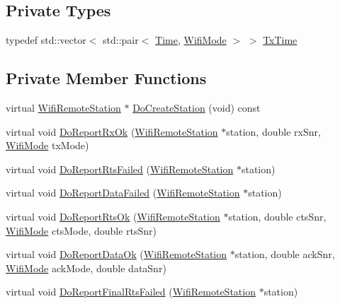 \subsection*{Private Types}
\begin{DoxyCompactItemize}
\item 
typedef std\+::vector$<$ std\+::pair$<$ \hyperlink{classns3_1_1Time}{Time}, \hyperlink{classns3_1_1WifiMode}{Wifi\+Mode} $>$ $>$ \hyperlink{classns3_1_1RrpaaWifiManager_a4319a75b6c1316e6b389e7108da56918}{Tx\+Time}
\end{DoxyCompactItemize}
\subsection*{Private Member Functions}
\begin{DoxyCompactItemize}
\item 
virtual \hyperlink{structns3_1_1WifiRemoteStation}{Wifi\+Remote\+Station} $\ast$ \hyperlink{classns3_1_1RrpaaWifiManager_ae43ecb855293337eb117fddafa983fd1}{Do\+Create\+Station} (void) const 
\item 
virtual void \hyperlink{classns3_1_1RrpaaWifiManager_a82aef96fbc77296653f7b9031639e24b}{Do\+Report\+Rx\+Ok} (\hyperlink{structns3_1_1WifiRemoteStation}{Wifi\+Remote\+Station} $\ast$station, double rx\+Snr, \hyperlink{classns3_1_1WifiMode}{Wifi\+Mode} tx\+Mode)
\item 
virtual void \hyperlink{classns3_1_1RrpaaWifiManager_ad721ce23003aee7f05d8b1f5b66b2c64}{Do\+Report\+Rts\+Failed} (\hyperlink{structns3_1_1WifiRemoteStation}{Wifi\+Remote\+Station} $\ast$station)
\item 
virtual void \hyperlink{classns3_1_1RrpaaWifiManager_a1eaf934bbd61fba16475071bd67a6064}{Do\+Report\+Data\+Failed} (\hyperlink{structns3_1_1WifiRemoteStation}{Wifi\+Remote\+Station} $\ast$station)
\item 
virtual void \hyperlink{classns3_1_1RrpaaWifiManager_aeef92718ae43a5daf8f7517d670ec201}{Do\+Report\+Rts\+Ok} (\hyperlink{structns3_1_1WifiRemoteStation}{Wifi\+Remote\+Station} $\ast$station, double cts\+Snr, \hyperlink{classns3_1_1WifiMode}{Wifi\+Mode} cts\+Mode, double rts\+Snr)
\item 
virtual void \hyperlink{classns3_1_1RrpaaWifiManager_aac417bc472f545a7f4a03ae8d788773f}{Do\+Report\+Data\+Ok} (\hyperlink{structns3_1_1WifiRemoteStation}{Wifi\+Remote\+Station} $\ast$station, double ack\+Snr, \hyperlink{classns3_1_1WifiMode}{Wifi\+Mode} ack\+Mode, double data\+Snr)
\item 
virtual void \hyperlink{classns3_1_1RrpaaWifiManager_adaa213814bd009121058b4fb0c4667ca}{Do\+Report\+Final\+Rts\+Failed} (\hyperlink{structns3_1_1WifiRemoteStation}{Wifi\+Remote\+Station} $\ast$station)

\end{DoxyCompactItemize}
